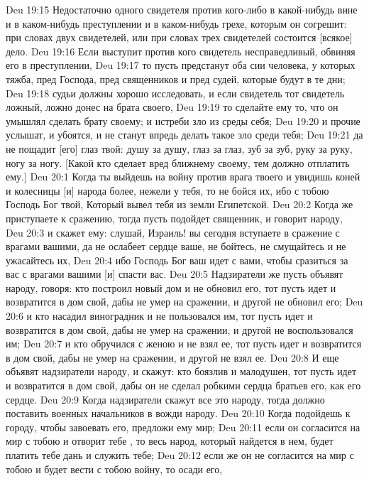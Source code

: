 \rsbpar\vs Deu 19:15 Недостаточно одного свидетеля против кого-либо в какой-нибудь вине и в каком-нибудь преступлении и в каком-нибудь грехе, которым он согрешит: при словах двух свидетелей, или при словах трех свидетелей состоится [всякое] дело.
\vs Deu 19:16 Если выступит против кого свидетель несправедливый, обвиняя его в преступлении,
\vs Deu 19:17 то пусть предстанут оба сии человека, у которых тяжба, пред Господа, пред священников и пред судей, которые будут в те дни;
\vs Deu 19:18 судьи должны хорошо исследовать, и если свидетель тот свидетель ложный, ложно донес на брата своего,
\vs Deu 19:19 то сделайте ему то, что он умышлял сделать брату своему; и  истреби зло из среды себя;
\vs Deu 19:20 и прочие услышат, и убоятся, и не станут впредь делать такое зло среди тебя;
\vs Deu 19:21 да не пощадит [его] глаз твой: душу за душу, глаз за глаз, зуб за зуб, руку за руку, ногу за ногу. [Какой кто сделает вред ближнему своему, тем должно отплатить ему.]
\vs Deu 20:1 Когда ты выйдешь на войну против врага твоего и увидишь коней и колесницы [и] народа более, нежели у тебя, то не бойся их, ибо с тобою Господь Бог твой, Который вывел тебя из земли Египетской.
\vs Deu 20:2 Когда же приступаете к сражению, тогда пусть подойдет священник, и говорит народу,
\vs Deu 20:3 и скажет ему: слушай, Израиль! вы сегодня вступаете в сражение с врагами вашими, да не ослабеет сердце ваше, не бойтесь, не смущайтесь и не ужасайтесь их,
\vs Deu 20:4 ибо Господь Бог ваш идет с вами, чтобы сразиться за вас с врагами вашими [и] спасти вас.
\vs Deu 20:5 Надзиратели же пусть объявят народу, говоря: кто построил новый дом и не обновил его, тот пусть идет и возвратится в дом свой, дабы не умер на сражении, и другой не обновил его;
\vs Deu 20:6 и кто насадил виноградник и не пользовался им, тот пусть идет и возвратится в дом свой, дабы не умер на сражении, и другой не воспользовался им;
\vs Deu 20:7 и кто обручился с женою и не взял ее, тот пусть идет и возвратится в дом свой, дабы не умер на сражении, и другой не взял ее.
\vs Deu 20:8 И еще объявят надзиратели народу, и скажут: кто боязлив и малодушен, тот пусть идет и возвратится в дом свой, дабы он не сделал робкими сердца братьев его, как его сердце.
\vs Deu 20:9 Когда надзиратели скажут все это народу, тогда должно поставить военных начальников в вожди народу.
\rsbpar\vs Deu 20:10 Когда подойдешь к городу, чтобы завоевать его, предложи ему мир;
\vs Deu 20:11 если он согласится на мир с тобою и отворит тебе , то весь народ, который найдется в нем, будет платить тебе дань и служить тебе;
\vs Deu 20:12 если же он не согласится на мир с тобою и будет вести с тобою войну, то осади его,
